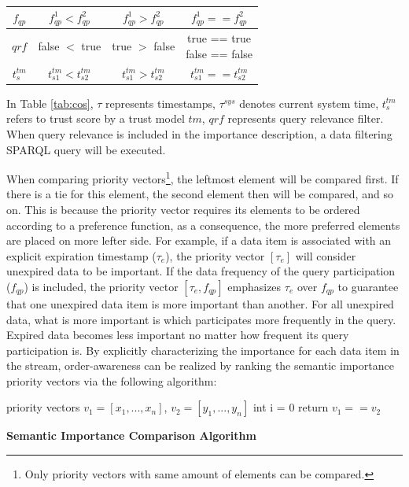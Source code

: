 \begin{table}[!htbp]
\begin{tabular}{|c|c|c|c|}
        $f_{qp}$ & $f^{1}_{qp} < f^{2}_{qp}$ & $f^{1}_{qp} > f^{2}_{qp}$ & $f^{1}_{qp} == f^{2}_{qp}$ \\ \hline
        $qrf$ & false $<$ true & true $>$ false & \makecell{true == true \\false == false} \\ \hline
        $t^{tm}_{s}$ & $t^{tm}_{s1} < t^{tm}_{s2}$ & $t^{tm}_{s1} > t^{tm}_{s2}$ & $t^{tm}_{s1} == t^{tm}_{s2}$ \\ \hline        
	\end{tabular}
\end{table}

In Table \ref{tab:cos}, $\tau$ represents timestamps, $\tau^{sys}$ denotes current system time, $t^{tm}_{s}$ refers to trust score by a trust model $tm$, $qrf$ represents query relevance filter. 
When query relevance is included in the importance description, a data filtering SPARQL query will be executed. 

When comparing priority vectors\footnote{Only priority vectors with same amount of elements can be compared.}, the leftmost element will be compared first. 
If there is a tie for this element, the second element then will be compared, and so on. 
This is because the priority vector requires its elements to be ordered according to a preference function, as a consequence, the more preferred elements are placed on more lefter side. 
For example, if a data item is associated with an explicit expiration timestamp ($\tau_{e}$), the priority vector $[\tau_{e}]$ will consider unexpired data to be important.
If the data frequency of the query participation ($f_{qp}$) is included, the priority vector $[\tau_{e}, f_{qp}]$ emphasizes $\tau_{e}$ over $f_{qp}$ to guarantee that one unexpired data item is more important than another.
For all unexpired data, what is more important is which participates more frequently in the query.
Expired data becomes less important no matter how frequent its query participation is.
By explicitly characterizing the importance for each data item in the stream, order-awareness can be realized by ranking the semantic importance priority vectors via the following algorithm:

\begin{algorithm}[!htbp]
  priority vectors $v_{1} = [x_{1}, ... , x_{n}]$, $v_{2} = [y_{1}, ... , y_{n}]$ \;
  int i = 0 \;
   {
  }
   { 
  	return $v_{1} == v_{2}$ \;  
  }
\caption{\textbf{Semantic Importance Comparison Algorithm}}
\end{algorithm}
%
